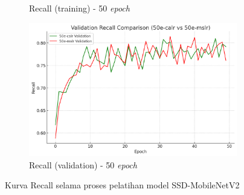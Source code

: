 \begin{figure}[htbp]
\begin{subfigure}{0.45\textwidth}
    \caption{Recall (training) - 50 \emph{epoch}}
  \end{subfigure}
  \hfill
  \begin{subfigure}{0.45\textwidth}
    \includegraphics[width=\textwidth]{gambar/bab4-val-recall-50e.png}
    \caption{Recall (validation) - 50 \emph{epoch}}
  \end{subfigure}
  \caption{Kurva Recall selama proses pelatihan model SSD-MobileNetV2}
  \label{fig:recall_curves}
\end{figure}

